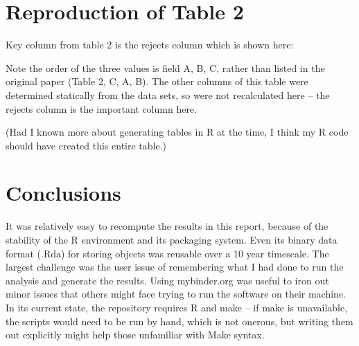 \documentclass[
]{article}
\newenvironment{Shaded}{\begin{snugshade}}{\end{snugshade}}
\newcommand{\DataTypeTok}[1]{\textcolor[rgb]{0.13,0.29,0.53}{#1}}
\newcommand{\ExtensionTok}[1]{#1}
\newcommand{\KeywordTok}[1]{\textcolor[rgb]{0.13,0.29,0.53}{\textbf{#1}}}
\newcommand{\NormalTok}[1]{#1}
\newcommand{\VariableTok}[1]{\textcolor[rgb]{0.00,0.00,0.00}{#1}}
\begin{document}
\hypertarget{reproduction-of-table-2}{%
\section{Reproduction of Table 2}\label{reproduction-of-table-2}}

Key column from table 2 is the rejects column which is shown here:

\begin{Shaded}
\end{Shaded}

Note the order of the three values is field A, B, C, rather than listed
in the original paper (Table 2, C, A, B). The other columns of this
table were determined statically from the data sets, so were not
recalculated here -- the rejects column is the important column here.

(Had I known more about generating tables in R at the time, I think my R
code should have created this entire table.)

\hypertarget{conclusions}{%
\section{Conclusions}\label{conclusions}}

It was relatively easy to recompute the results in this report, because
of the stability of the R environment and its packaging system. Even its
binary data format (.Rda) for storing objects was reusable over a 10
year timescale. The largest challenge was the user issue of remembering
what I had done to run the analysis and generate the results. Using
mybinder.org was useful to iron out minor issues that others might face
trying to run the software on their machine. In its current state, the
repository requires R and make -- if make is unavailable, the scripts
would need to be run by hand, which is not onerous, but writing them out
explicitly might help those unfamiliar with Make syntax.
\end{document}
